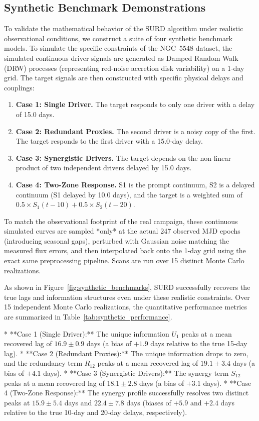 \documentclass[fleqn,usenatbib]{mnras}
\begin{document}
\subsection{Synthetic Benchmark Demonstrations}
\label{sec:synthetic_benchmarks}To validate the mathematical behavior of the SURD algorithm under realistic observational conditions, we construct a suite of four synthetic benchmark models. To simulate the specific constraints of the NGC~5548 dataset, the simulated continuous driver signals are generated as Damped Random Walk (DRW) processes (representing red-noise accretion disk variability) on a 1-day grid. The target signals are then constructed with specific physical delays and couplings:
\begin{enumerate}
\item \textbf{Case 1: Single Driver.} The target responds to only one driver with a delay of 15.0 days.
\item \textbf{Case 2: Redundant Proxies.} The second driver is a noisy copy of the first. The target responds to the first driver with a 15.0-day delay.
\item \textbf{Case 3: Synergistic Drivers.} The target depends on the non-linear product of two independent drivers delayed by 15.0 days.
\item \textbf{Case 4: Two-Zone Response.} S1 is the prompt continuum, S2 is a delayed continuum (S1 delayed by 10.0 days), and the target is a weighted sum of $0.5 \times S_1(t-10) + 0.5 \times S_2(t-20)$.
\end{enumerate}

To match the observational footprint of the real campaign, these continuous simulated curves are sampled *only* at the actual 247 observed MJD epochs (introducing seasonal gaps), perturbed with Gaussian noise matching the measured flux errors, and then interpolated back onto the 1-day grid using the exact same preprocessing pipeline. Scans are run over 15 distinct Monte Carlo realizations.

As shown in Figure~\ref{fig:synthetic_benchmarks}, SURD successfully recovers the true lags and information structures even under these realistic constraints. Over 15 independent Monte Carlo realizations, the quantitative performance metrics are summarized in Table~\ref{tab:synthetic_performance}.

*   **Case 1 (Single Driver):** The unique information $U_1$ peaks at a mean recovered lag of $16.9 \pm 0.9$ days (a bias of $+1.9$ days relative to the true 15-day lag).
*   **Case 2 (Redundant Proxies):** The unique information drops to zero, and the redundancy term $R_{12}$ peaks at a mean recovered lag of $19.1 \pm 3.4$ days (a bias of $+4.1$ days).
*   **Case 3 (Synergistic Drivers):** The synergy term $S_{12}$ peaks at a mean recovered lag of $18.1 \pm 2.8$ days (a bias of $+3.1$ days).
*   **Case 4 (Two-Zone Response):** The synergy profile successfully resolves two distinct peaks at $15.9 \pm 5.4$ days and $22.4 \pm 7.8$ days (biases of $+5.9$ and $+2.4$ days relative to the true 10-day and 20-day delays, respectively).
\end{document}
